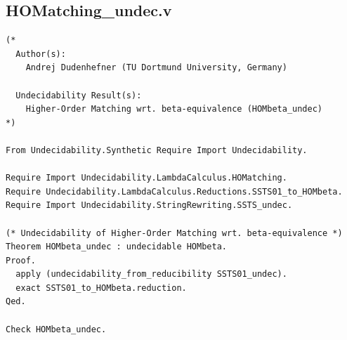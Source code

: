 \subsection*{HOMatching\_undec.v}
\begin{lstlisting}
(*
  Author(s):
    Andrej Dudenhefner (TU Dortmund University, Germany)

  Undecidability Result(s):
    Higher-Order Matching wrt. beta-equivalence (HOMbeta_undec)
*)

From Undecidability.Synthetic Require Import Undecidability.

Require Import Undecidability.LambdaCalculus.HOMatching.
Require Undecidability.LambdaCalculus.Reductions.SSTS01_to_HOMbeta.
Require Import Undecidability.StringRewriting.SSTS_undec.

(* Undecidability of Higher-Order Matching wrt. beta-equivalence *)
Theorem HOMbeta_undec : undecidable HOMbeta.
Proof.
  apply (undecidability_from_reducibility SSTS01_undec).
  exact SSTS01_to_HOMbeta.reduction.
Qed.

Check HOMbeta_undec.

\end{lstlisting}
